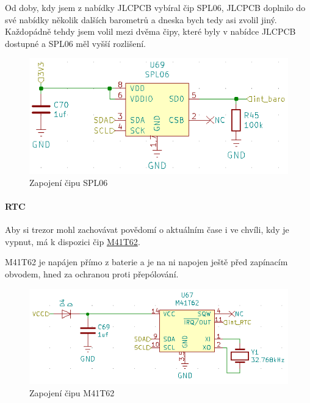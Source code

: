Od doby, kdy jsem z nabídky JLCPCB vybíral čip SPL06, JLCPCB doplnilo do své nabídky několik dalších barometrů a dneska bych tedy asi zvolil jiný. Každopádně tehdy jsem volil 
mezi dvěma čipy, které byly v nabídce JLCPCB dostupné a SPL06 měl vyšší rozlišení.

\begin{figure}[htbp]
    \centering
    \includegraphics[width=\textwidth]{kapitoly/obrazky/E4/vnimani/SPL06.png}
    \caption{Zapojení čipu SPL06}
    \label{fig:E4-SPL06}
\end{figure}

\newpage

\paragraph{RTC}
Aby si trezor mohl zachovávat povědomí o aktuálním čase i ve chvíli, kdy je vypnut, má k dispozici čip \href{https://datasheet.lcsc.com/szlcsc/STMicroelectronics-M41T62Q6F_C113207.pdf}{M41T62}.

M41T62 je napájen přímo z baterie a je na ni napojen ještě před zapínacím obvodem, hned za ochranou proti přepólování.

\begin{figure}[htbp]
    \centering
    \includegraphics[width=\textwidth]{kapitoly/obrazky/E4/vnimani/RTC.png}
    \caption{Zapojení čipu M41T62}
    \label{fig:E4-M41T62}
\end{figure}

